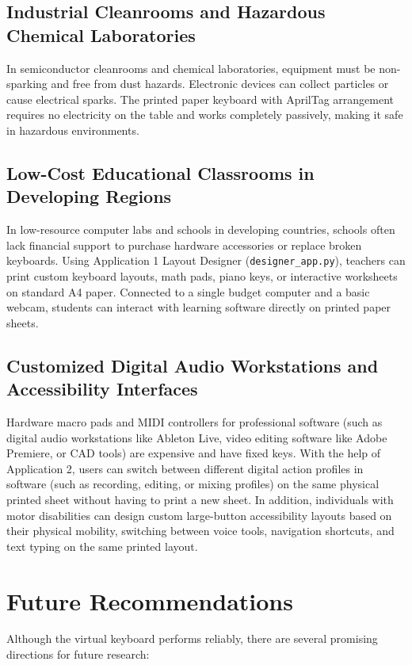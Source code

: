 \subsection{Industrial Cleanrooms and Hazardous Chemical Laboratories}
In semiconductor cleanrooms and chemical laboratories, equipment must be non-sparking and free from dust hazards. Electronic devices can collect particles or cause electrical sparks. The printed paper keyboard with AprilTag arrangement requires no electricity on the table and works completely passively, making it safe in hazardous environments.

\subsection{Low-Cost Educational Classrooms in Developing Regions}
In low-resource computer labs and schools in developing countries, schools often lack financial support to purchase hardware accessories or replace broken keyboards. Using Application 1 Layout Designer (\texttt{designer\_app.py}), teachers can print custom keyboard layouts, math pads, piano keys, or interactive worksheets on standard A4 paper. Connected to a single budget computer and a basic webcam, students can interact with learning software directly on printed paper sheets.

\subsection{Customized Digital Audio Workstations and Accessibility Interfaces}
Hardware macro pads and MIDI controllers for professional software (such as digital audio workstations like Ableton Live, video editing software like Adobe Premiere, or CAD tools) are expensive and have fixed keys. With the help of Application 2, users can switch between different digital action profiles in software (such as recording, editing, or mixing profiles) on the same physical printed sheet without having to print a new sheet. In addition, individuals with motor disabilities can design custom large-button accessibility layouts based on their physical mobility, switching between voice tools, navigation shortcuts, and text typing on the same printed layout.

\section{Future Recommendations}
\label{sec:concl_future}
Although the virtual keyboard performs reliably, there are several promising directions for future research:

